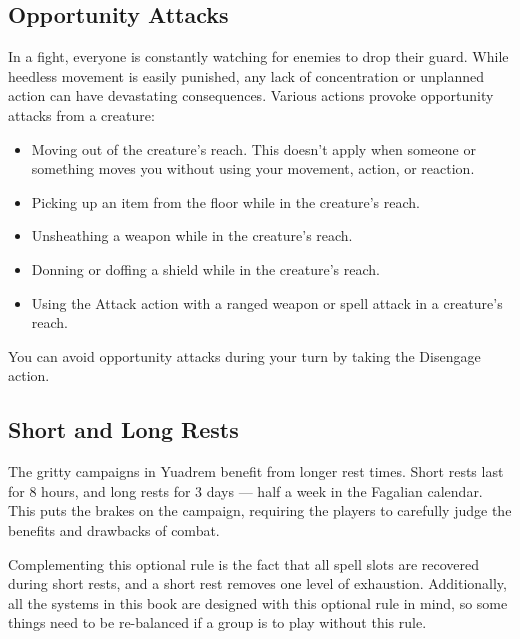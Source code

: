\subsection*{Opportunity Attacks} \label{rule::opportunityattacks}
    In a fight, everyone is constantly watching for enemies to drop their guard.
    While heedless movement is easily punished, any lack of concentration or unplanned action can have devastating consequences.
    Various actions provoke opportunity attacks from a creature:
    \begin{itemize}
        \item Moving out of the creature's reach.
        This doesn't apply when someone or something moves you without using your movement, action, or reaction.

        \newpage

        \item Picking up an item from the floor while in the creature's reach.
        \item Unsheathing a weapon while in the creature's reach.
        \item Donning or doffing a shield while in the creature's reach.
        \item Using the Attack action with a ranged weapon or spell attack in a creature's reach.
    \end{itemize}
    You can avoid opportunity attacks during your turn by taking the Disengage action.

\subsection*{Short and Long Rests} \label{ssec::shortandlongrests}
    The gritty campaigns in Yuadrem benefit from longer rest times.
    Short rests last for 8 hours, and long rests for 3 days --- half a week in the Fagalian calendar.
    This puts the brakes on the campaign, requiring the players to carefully judge the benefits and drawbacks of combat.

    Complementing this optional rule is the fact that all spell slots are recovered during short rests, and a short rest removes one level of exhaustion.
    Additionally, all the systems in this book are designed with this optional rule in mind, so some things need to be re-balanced if a group is to play without this rule.


